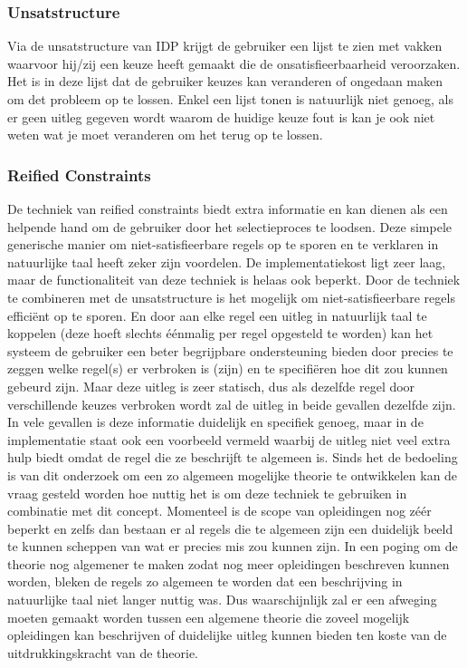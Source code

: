 \subsubsection{Unsatstructure}
Via de unsatstructure van IDP krijgt de gebruiker een lijst te zien met vakken waarvoor hij/zij een keuze heeft gemaakt die de onsatisfieerbaarheid veroorzaken. Het is in deze lijst dat de gebruiker keuzes kan veranderen of ongedaan maken om det probleem op te lossen. Enkel een lijst tonen is natuurlijk niet genoeg, als er geen uitleg gegeven wordt waarom de huidige keuze fout is kan je ook niet weten wat je moet veranderen om het terug op te lossen. 

\subsubsection{Reified Constraints}
De techniek van reified constraints biedt extra informatie en kan dienen als een helpende hand om de gebruiker door het selectieproces te loodsen. Deze simpele generische manier om niet-satisfieerbare regels op te sporen en te verklaren in natuurlijke taal heeft zeker zijn voordelen. De implementatiekost ligt zeer laag, maar de functionaliteit van deze techniek is helaas ook beperkt. Door de techniek te combineren met de unsatstructure is het mogelijk om niet-satisfieerbare regels effici\"{e}nt op te sporen. En door aan elke regel een uitleg in natuurlijk taal te koppelen (deze hoeft slechts \'{e}\'{e}nmalig per regel opgesteld te worden) kan het systeem de gebruiker een beter begrijpbare ondersteuning bieden door precies te zeggen welke regel(s) er verbroken is (zijn) en te specifi\"{e}ren hoe dit zou kunnen gebeurd zijn. Maar deze uitleg is zeer statisch, dus als dezelfde regel door verschillende keuzes verbroken wordt zal de uitleg in beide gevallen dezelfde zijn. In vele gevallen is deze informatie duidelijk en specifiek genoeg, maar in de implementatie staat ook een voorbeeld vermeld waarbij de uitleg niet veel extra hulp biedt omdat de regel die ze beschrijft te algemeen is. Sinds het de bedoeling is van dit onderzoek om een zo algemeen mogelijke theorie te ontwikkelen kan de vraag gesteld worden hoe nuttig het is om deze techniek te gebruiken in combinatie met dit concept. Momenteel is de scope van opleidingen nog z\'{e}\'{e}r beperkt en zelfs dan bestaan er al regels die te algemeen zijn een duidelijk beeld te kunnen scheppen van wat er precies mis zou kunnen zijn. In een poging om de theorie nog algemener te maken zodat nog meer opleidingen beschreven kunnen worden, bleken de regels zo algemeen te worden dat een beschrijving in natuurlijke taal niet langer nuttig was. Dus waarschijnlijk zal er een afweging moeten gemaakt worden tussen een algemene theorie die zoveel mogelijk opleidingen kan beschrijven of duidelijke uitleg kunnen bieden ten koste van de uitdrukkingskracht van de theorie.

